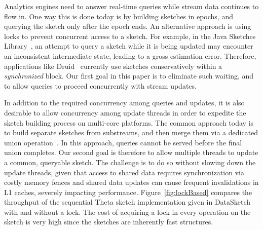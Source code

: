  Analytics engines need to answer real-time queries while  stream data continues to flow in.
 One way this is done 
today is by building sketches in epochs, and querying the sketch only after
 the epoch ends. An alternative approach is using locks to prevent concurrent access to a sketch.
 For example, in the Java Sketches Library~\cite{sketchesLibrary},  an 
attempt to query a sketch  while it is being updated  may encounter an inconsistent
intermediate state, leading to a gross estimation error. Therefore, applications like Druid~\cite{druid}
currently use sketches conservatively within a \emph{synchronized} block.
Our first goal in this paper is to eliminate such waiting, and to allow queries to proceed 
concurrently with stream updates. 

In addition to the required concurrency among queries and updates,
it is also desirable to allow
concurrency among update threads in order to expedite the sketch building process on multi-core platforms. 
The common approach today is to build separate sketches from substreams, 
and then merge them via a dedicated union operation~\cite{multi-KMV}. 
In this approach, queries cannot be served before the final union completes. 
Our second goal is therefore to allow multiple threads to update a common, 
queryable sketch. The challenge is to do so without slowing down the update threads,
given that access to shared data requires  synchronization via costly memory fences 
and shared data updates can cause frequent invalidations in L1 caches, severely impacting performance. 
Figure~\ref{fig:lockBased} compares the throughput of the
sequential Theta sketch implementation given in DataSketch with
and without a lock.
The cost of acquiring a lock in every
operation on the sketch is very high since the sketches are
inherently fast structures.

